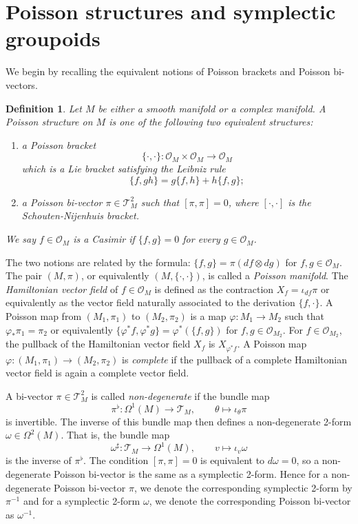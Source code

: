\documentclass{amsart}
\newtheorem{definition}[theorem]{Definition}
\numberwithin{equation}{section}
\newcommand{\cO}{\mathcal{O}}
\newcommand{\cT}{\mathcal{T}}
\begin{document}
\section{Poisson structures and symplectic groupoids}
\label{sec:Poisson generalities}
We begin by recalling the equivalent notions of Poisson brackets and Poisson bi-vectors.
\begin{definition} 
  \label{def: PoissonMfld}
  Let $M$ be either a smooth manifold or a complex manifold.
  A \emph{Poisson structure} on $M$ is one of the following two equivalent structures:
  \begin{enumerate}
    \item a \emph{Poisson bracket}
      $$\{\cdot, \cdot\}: \cO_M \times \cO_M \to \cO_M$$
      which is a Lie bracket satisfying the Leibniz rule
      $$\{f, gh\} = g\{f,h\} + h\{f,g\};$$
    \item a \emph{Poisson bi-vector} $\pi \in \cT^2_M$ such that $[\pi, \pi] = 0$, where $[\cdot, \cdot]$ is the Schouten-Nijenhuis bracket.
  \end{enumerate}
  We say $f \in \cO_M$ is a Casimir if $\{f, g\} = 0$ for every $g\in \cO_M$.
\end{definition}

The two notions are related by the formula: $\{f, g\} = \pi (df \otimes dg)$ for $f, g\in \cO_M$.
The pair $(M, \pi)$, or equivalently $(M, \{\cdot,\cdot\})$, is called a \emph{Poisson manifold}.
The \emph{Hamiltonian vector field} of $f \in \cO_M$ is defined as the contraction $X_f = \iota_{df}\pi$ or equivalently as the vector field naturally associated to the derivation $\{f,\cdot\}$.
A Poisson map from $(M_1, \pi_1)$ to $(M_2, \pi_2)$ is a map $\varphi: M_1\to M_2$ such that $\varphi_*\pi_1 = \pi_2$ or equivalently $\{\varphi^*f, \varphi^*g\} = \varphi^*(\{f, g\})$ for $f, g \in \cO_{M_2}$.
For $f \in \cO_{M_2}$, the pullback of the Hamiltonian vector field $X_f$ is $X_{\varphi^*f}$.
A Poisson map $\varphi: (M_1, \pi_1) \to (M_2, \pi_2)$ is \emph{complete} if the pullback of a complete Hamiltonian vector field is again a complete vector field.

A bi-vector $\pi \in \cT^2_M$ is called \emph{non-degenerate} if the bundle map
\[\pi^\flat: \Omega^1(M) \to \cT_M, \qquad \theta \mapsto \iota_\theta \pi\]
is invertible.
The inverse of this bundle map then defines a non-degenerate 2-form $\omega \in \Omega^2(M)$.
That is, the bundle map
\[\omega^\sharp: \cT_M \to \Omega^1(M), \qquad v \mapsto \iota_v \omega\]
is the inverse of $\pi^\flat$.
The condition $[\pi,\pi]=0$ is equivalent to $d\omega = 0$, so a non-degenerate Poisson bi-vector is the same as a symplectic 2-form.
Hence for a non-degenerate Poisson bi-vector $\pi$, we denote the corresponding symplectic 2-form by $\pi^{-1}$ and for a symplectic 2-form $\omega$, we denote the corresponding Poisson bi-vector as $\omega^{-1}$.
\end{document}
